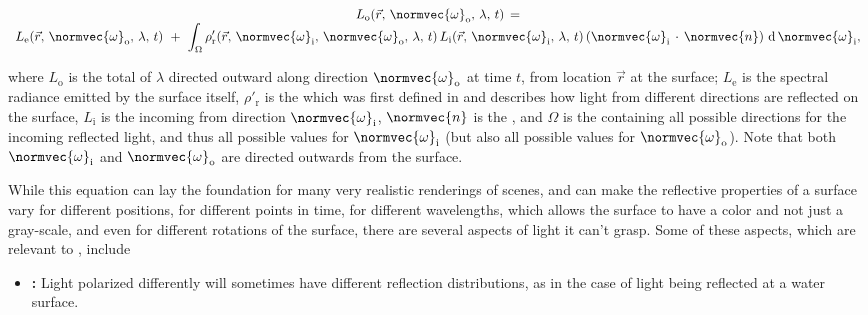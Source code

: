 {\begin{equation} \label{eq:rendering_equation_original}
\begin{array}{c}
L_{\text{o}}(\vec{r},\,\normvec{\omega}_{\text{o}},\, \lambda,\, t) \,= \\
\displaystyle L_{\text{e}}(\vec{r},\, \normvec{\omega}_{\text{o}},\, \lambda,\, t) \ + \ \int_\Omega \rho'_{\text{r}}(\vec{r},\, \normvec{\omega}_{\text{i}},\, \normvec{\omega}_{\text{o}},\, \lambda,\, t)\, L_{\text{i}}(\vec{r},\, \normvec{\omega}_{\text{i}},\, \lambda,\, t)\, (\normvec{\omega}_{\text{i}}\,\cdot\,\normvec{n})\, \operatorname d \normvec{\omega}_{\text{i}},
\end{array}
\end{equation}

where $L_{\text{o}}$ is the total  of  $\lambda$ directed outward along direction $\normvec{\omega}_{\text{o}}$ at time $t$, from location $\vec{r}$ at the surface; $L_{\text{e}}$ is the spectral radiance emitted by the surface itself, $\rho'_{\text{r}}$ is the \BRDF which was first defined in \citep{temp} and describes how light from different directions are reflected on the surface, $L_{\text{i}}$ is the  incoming from direction $\normvec{\omega}_{\text{i}}$, $\normvec{n}$ is the , and $\Omega$ is the  containing all possible directions for the incoming reflected light, and thus all possible values for $\normvec{\omega}_{\text{i}}$ (but also all possible values for $\normvec{\omega}_{\text{o}}$). Note that both $\normvec{\omega}_{\text{i}}$ and $\normvec{\omega}_{\text{o}}$ are directed outwards from the surface.

While this equation can lay the foundation for many very realistic renderings of \threedimensional scenes, and can make the reflective properties of a surface vary for different positions, for different points in time, for different wavelengths, which allows the surface to have a color and not just a gray-scale, and even for different rotations of the surface, there are several aspects of light it can't grasp. Some of these aspects, which are relevant to \surfacewaterrendering, include

\begin{itemize}
\item \textbf{:} Light polarized differently will sometimes have different reflection distributions, as in the case of light being reflected at a water surface.


\end{itemize}}
